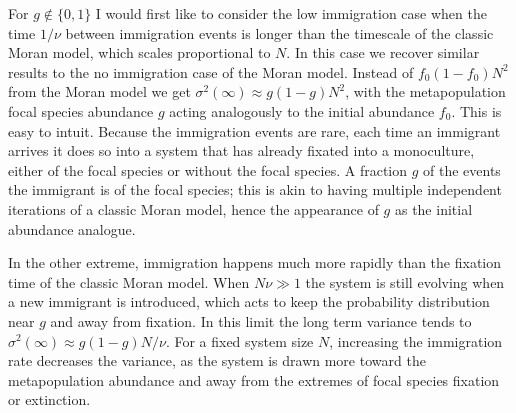 For $g\notin \{0,1\}$ I would first like to consider the low immigration case when the time $1/\nu$ between immigration events is longer than the timescale of the classic Moran model, which scales proportional to $N$. 
In this case we recover similar results to the no immigration case of the Moran model. 
Instead of $f_0(1-f_0)N^2$ from the Moran model we get $\sigma^2(\infty) \approx g(1-g) N^2$, with the metapopulation focal species abundance $g$ acting analogously to the initial abundance $f_0$. 
This is easy to intuit. Because the immigration events are rare, each time an immigrant arrives it does so into a system that has already fixated into a monoculture, either of the focal species or without the focal species. 
A fraction $g$ of the events the immigrant is of the focal species; this is akin to having multiple independent iterations of a classic Moran model, hence the appearance of $g$ as the initial abundance analogue. %

In the other extreme, immigration happens much more rapidly than the fixation time of the classic Moran model. 
When $N\nu\gg 1$ the system is still evolving when a new immigrant is introduced, which acts to keep the probability distribution near $g$ and away from fixation. 
In this limit the long term variance tends to $\sigma^2(\infty) \approx g(1-g) N/\nu$. 
For a fixed system size $N$, increasing the immigration rate decreases the variance, as the system is drawn more toward the metapopulation abundance and away from the extremes of focal species fixation or extinction. 

